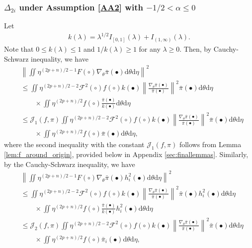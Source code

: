 \documentclass[preprint,11pt]{imsart}
\numberwithin{equation}{section}
\theoremstyle{plain}
\theoremstyle{definition}
\theoremstyle{remark}
\newcommand{\rd}{\mathrm{d}}
\begin{document}
\subsubsection{$\Delta_{2i}$ under Assumption \ref{AA2} with $-1/2<\alpha\leq 0$}
\label{sec:subsub2}
Let
\begin{align*}
 k(\lambda)=\lambda^{1/2}I_{[0,1]}(\lambda)+ I_{(1,\infty)}(\lambda).
\end{align*}
Note that $0\leq k(\lambda)\leq 1$ and $1/k(\lambda)\geq 1$ for any $\lambda\geq 0$.
Then, by Cauchy-Schwarz inequality, we have
\begin{equation}\label{eq:Del2}
 \begin{split}
& \left\|\iint 
  \eta^{(2p+n)/2-1} F(\circ) 
\nabla_\theta\bar{\pi}(\bullet) \rd \theta   \rd \eta \right\|^2 \\
& \leq
 \iint   \eta^{(2p+n)/2-2} \mathcal{F}^2(\circ) f(\circ)
  k(\bullet) \left\|\frac{\nabla_\theta\bar{\pi}(\bullet)}{\bar{\pi}(\bullet)}\right\|^2
  \bar{\pi}(\bullet) \rd \theta   \rd \eta \\
 &\qquad \times
 \iint   \eta^{(2p+n)/2} f(\circ) \frac{\bar{\pi}(\bullet)}{k(\bullet)} \rd \theta   \rd \eta \\
& \leq
\mathcal{J}_1(f,\pi) \iint   \eta^{(2p+n)/2-2} \mathcal{F}^2(\circ) f(\circ)
  k(\bullet) \left\|\frac{\nabla_\theta\bar{\pi}(\bullet)}{\bar{\pi}(\bullet)}\right\|^2
  \bar{\pi}(\bullet) \rd \theta   \rd \eta \\
 &\qquad \times
 \iint   \eta^{(2p+n)/2} f(\circ) \bar{\pi}(\bullet) \rd \theta   \rd \eta,
\end{split}
\end{equation}
where the second inequality with the constant $\mathcal{J}_1(f,\pi)$ follows
from Lemma \ref{lem:f_around_origin}, provided below in Appendix \ref{sec:finallemmas}.
Similarly, by the Cauchy-Schwarz inequality, we have
\begin{equation}\label{eq:Del2.00}
 \begin{split}
& \left\|\iint 
  \eta^{(2p+n)/2-1} F(\circ) 
\nabla_\theta\bar{\pi}(\bullet) h_i^2(\bullet)\rd \theta   \rd \eta \right\|^2 \\
& \leq
 \iint   \eta^{(2p+n)/2-2} \mathcal{F}^2(\circ) f(\circ)
 k(\bullet)\left\|\frac{\nabla_\theta\bar{\pi}(\bullet)}{\bar{\pi}(\bullet)}\right\|^2 \bar{\pi}(\bullet) h_i^2(\bullet)\rd \theta   \rd \eta \\
 &\qquad \times
 \iint   \eta^{(2p+n)/2} f(\circ) \frac{\bar{\pi}(\bullet)}{k(\bullet)} h_i^2(\bullet)\rd \theta   \rd \eta \\
& \leq
\mathcal{J}_2(f,\pi) \iint   \eta^{(2p+n)/2-2} \mathcal{F}^2(\circ) f(\circ)
  k(\bullet)
  \left\|\frac{\nabla_\theta\bar{\pi}(\bullet)}{\bar{\pi}(\bullet)}\right\|^2
  \bar{\pi}(\bullet) \rd \theta   \rd \eta \\
 &\qquad \times
 \iint   \eta^{(2p+n)/2} f(\circ) \bar{\pi}_i(\bullet) \rd \theta   \rd \eta,
\end{split}
\end{equation}
\end{document}
